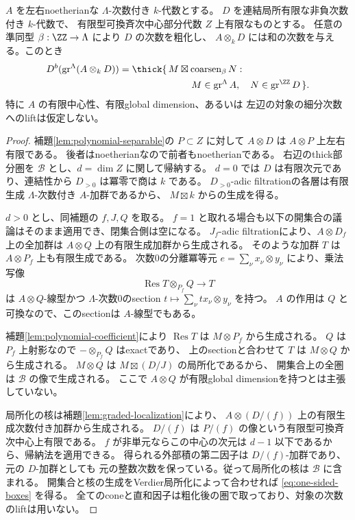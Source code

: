 \begin{theorem}[一方だけが有限中心である外部積生成]\label{thm:one-sided-boxes}
 \(A\) を左右noetherianな \(\Lambda\)-次数付き \(k\)-代数とする。
 \(D\) を連結局所有限な非負次数付き \(k\)-代数で、
 有限型可換斉次中心部分代数 \(Z\) 上有限なものとする。
 任意の準同型 \(\beta:\ZZ\to\Lambda\) により \(D\) の次数を粗化し、
 \(A\otimes_kD\) には和の次数を与える。このとき
 \begin{equation}\label{eq:one-sided-boxes}
 \begin{split}
 D^b(\operatorname{gr}^{\Lambda}(A\otimes_kD))
 =\thick\{\,M\boxtimes\operatorname{coarsen}_\beta N:\qquad\qquad\qquad\quad\\
 M\in\operatorname{gr}^{\Lambda}A,\quad
 N\in\operatorname{gr}^{\ZZ}D\,\}.
 \end{split}
 \end{equation}
 特に \(A\) の有限中心性、有限global dimension、あるいは
 左辺の対象の細分次数へのliftは仮定しない。
\end{theorem}
\begin{proof}
 補題\ref{lem:polynomial-separable}の \(P\subset Z\) に対して
 \(A\otimes D\) は \(A\otimes P\) 上左右有限である。
 後者はnoetherianなので前者もnoetherianである。
 右辺のthick部分圏を \(\mathcal B\) とし、\(d=\dim Z\) に関して帰納する。
 \(d=0\) では \(D\) は有限次元であり、連結性から \(D_{>0}\) は冪零で商は \(k\) である。
 \(D_{>0}\)-adic filtrationの各層は有限生成 \(\Lambda\)-次数付き \(A\)-加群であるから、
 \(M\boxtimes k\) からの生成を得る。

 \(d>0\) とし、同補題の \(f,J,Q\) を取る。
 \(f=1\) と取れる場合も以下の開集合の議論はそのまま適用でき、閉集合側は空になる。
 \(J_f\)-adic filtrationにより、\(A\otimes D_f\) 上の全加群は
 \(A\otimes Q\) 上の有限生成加群から生成される。
 そのような加群 \(T\) は \(A\otimes P_f\) 上も有限生成である。
 次数0の分離冪等元 \(e=\sum_\nu x_\nu\otimes y_\nu\) により、乗法写像
 \[
 \operatorname{Res}T\otimes_{P_f}Q\longrightarrow T
 \]
 は \(A\otimes Q\)-線型かつ \(\Lambda\)-次数0のsection
 \(t\mapsto\sum_\nu tx_\nu\otimes y_\nu\) を持つ。
 \(A\) の作用は \(Q\) と可換なので、このsectionは \(A\)-線型でもある。

 補題\ref{lem:polynomial-coefficient}により \(\operatorname{Res}T\) は
 \(M\otimes P_f\) から生成される。
 \(Q\) は \(P_f\) 上射影なので \(-\otimes_{P_f}Q\) はexactであり、
 上のsectionと合わせて \(T\) は \(M\otimes Q\) から生成される。
 \(M\otimes Q\) は \(M\boxtimes(D/J)\) の局所化であるから、
 開集合上の全圏は \(\mathcal B\) の像で生成される。
 ここで \(A\otimes Q\) が有限global dimensionを持つとは主張していない。

 局所化の核は補題\ref{lem:graded-localization}により、
 \(A\otimes(D/(f))\) 上の有限生成次数付き加群から生成される。
 \(D/(f)\) は \(P/(f)\) の像という有限型可換斉次中心上有限である。
 \(f\) が非単元ならこの中心の次元は \(d-1\) 以下であるから、帰納法を適用できる。
 得られる外部積の第二因子は \(D/(f)\)-加群であり、元の \(D\)-加群としても
 元の整数次数を保っている。従って局所化の核は \(\mathcal B\) に含まれる。
 開集合と核の生成をVerdier局所化によって合わせれば \eqref{eq:one-sided-boxes} を得る。
 全てのconeと直和因子は粗化後の圏で取っており、対象の次数のliftは用いない。
\end{proof}

